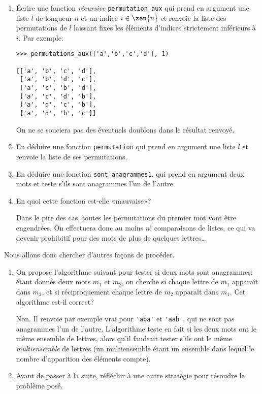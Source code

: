 \documentclass[10pt]{article}
\begin{document}
\begin{enumerate}[resume]
\item Écrire une fonction \emph{récursive} \verb+permutation_aux+ qui
  prend en argument une liste $l$ de longueur $n$ et un indice
  $i\in\zen{n}$ et renvoie la liste des permutations de $l$ laissant
  fixes les éléments d'indices strictement inférieurs à $i$. Par
  exemple:
\begin{verbatim}
>>> permutations_aux(['a','b','c','d'], 1)

[['a', 'b', 'c', 'd'],
 ['a', 'b', 'd', 'c'],
 ['a', 'c', 'b', 'd'],
 ['a', 'c', 'd', 'b'],
 ['a', 'd', 'c', 'b'],
 ['a', 'd', 'b', 'c']]
\end{verbatim}
  On ne se souciera pas des éventuels doublons dans le résultat renvoyé. 
\item En déduire une fonction \verb+permutation+ qui prend en argument une liste $l$ et renvoie la liste de ses permutations.
\item En déduire une fonction \verb+sont_anagrammes1+, qui prend en argument deux mots et teste s'ils sont anagrammes l'un de l'autre. 
\item En quoi cette fonction est-elle «mauvaise»?

  \begin{correction}
    Dans le pire des cas, toutes les permutations du premier mot vont
    être engendrées. On effectuera donc au moins $n!$ comparaisons de
    listes, ce qui va devenir prohibitif pour des mots de plus de
    quelques lettres\dots
  \end{correction}
  
\end{enumerate}

Nous allons donc chercher d'autres façons de procéder.

\begin{enumerate}[resume]
\item On propose l'algorithme suivant pour tester si deux mots sont
  anagrammes: étant donnés deux mots $m_1$ et $m_2$, on cherche si
  chaque lettre de $m_1$ apparaît dans $m_2$, et si réciproquement
  chaque lettre de $m_2$ apparaît dans $m_1$. Cet algorithme est-il correct?

  \begin{correction}
    Non. Il renvoie par exemple vrai pour \verb+'aba'+ et
    \verb+'aab'+, qui ne sont pas anagrammes l'un de
    l'autre. L'algorithme teste en fait si les deux mots ont le même
    ensemble de lettres, alors qu'il faudrait tester s'ils ont le même
    \emph{multiensemble} de lettres (un multiensemble étant un
    ensemble dans lequel le nombre d'apparition des éléments compte).
  \end{correction}
  
\item Avant de passer à la suite, réfléchir à une autre stratégie pour
  résoudre le problème posé.
\end{enumerate}
\end{document}
